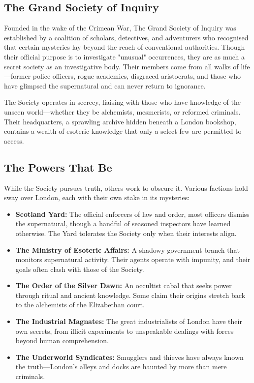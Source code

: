 \subsection{The Grand Society of Inquiry}

Founded in the wake of the Crimean War, The Grand Society of Inquiry was established by a coalition of scholars, detectives, and adventurers who recognised that certain mysteries lay beyond the reach of conventional authorities. Though their official purpose is to investigate "unusual" occurrences, they are as much a secret society as an investigative body. Their members come from all walks of life—former police officers, rogue academics, disgraced aristocrats, and those who have glimpsed the supernatural and can never return to ignorance.

The Society operates in secrecy, liaising with those who have knowledge of the unseen world—whether they be alchemists, mesmerists, or reformed criminals. Their headquarters, a sprawling archive hidden beneath a London bookshop, contains a wealth of esoteric knowledge that only a select few are permitted to access.

\subsection{The Powers That Be}

While the Society pursues truth, others work to obscure it. Various factions hold sway over London, each with their own stake in its mysteries:

\begin{itemize}
    \item \textbf{Scotland Yard:} The official enforcers of law and order, most officers dismiss the supernatural, though a handful of seasoned inspectors have learned otherwise. The Yard tolerates the Society only when their interests align.
    \item \textbf{The Ministry of Esoteric Affairs:} A shadowy government branch that monitors supernatural activity. Their agents operate with impunity, and their goals often clash with those of the Society.
    \item \textbf{The Order of the Silver Dawn:} An occultist cabal that seeks power through ritual and ancient knowledge. Some claim their origins stretch back to the alchemists of the Elizabethan court.
    \item \textbf{The Industrial Magnates:} The great industrialists of London have their own secrets, from illicit experiments to unspeakable dealings with forces beyond human comprehension.
    \item \textbf{The Underworld Syndicates:} Smugglers and thieves have always known the truth—London's alleys and docks are haunted by more than mere criminals.
\end{itemize}

